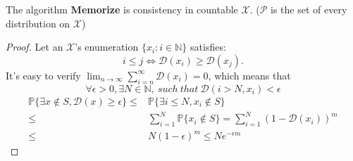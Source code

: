 \documentclass{beamer}
\begin{document}
\begin{frame}
    \begin{theorem}
        The algorithm \textbf{Memorize} is consistency in countable $ \mathcal{X} $. ($ \mathcal{P} $ is the set of every distribution on $ \mathcal{X} $)
        \begin{proof}
            Let an $ \mathcal{X} $'s enumeration $ \{ x_i : i \in \mathbb{N} \} $ satisfies: 
            \[
                i \le j \Leftrightarrow \mathcal{D}(x_i) \ge \mathcal{D}(x_j).
            \]
            It's easy to verify $ \lim_{n \to \infty} \sum^{\infty}_{i=n} \mathcal{D}(x_i) = 0 $, which means that
            \[
                \forall \epsilon > 0, \exists N \in \mathbb{N},\ such\ that\ \mathcal{D}(i > N, x_i) < \epsilon
            \]
            \begin{align*}
                \mathbb{P} \{ \exists x \notin S, \mathcal{D}(x) \ge \epsilon \}
                \le& \mathbb{P} \{ \exists i \le N, x_i \notin S \} \\
                \le& \sum^{N}_{i=1} \mathbb{P} \{ x_i \notin S \} = \sum^{N}_{i=1} {( 1 - \mathcal{D}(x_i) )}^m \\
                \le& N {(1-\epsilon)}^m \le N e^{-\epsilon m}
            \end{align*}
        \end{proof}
    \end{theorem}
\end{frame}
\end{document}
